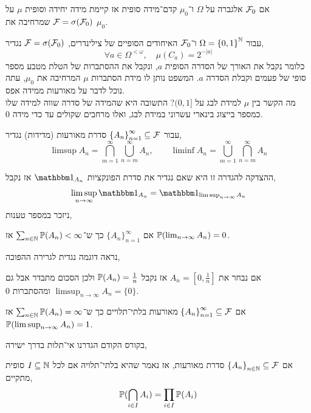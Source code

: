\begin{theorem}
	אם $\mathcal{F}_0$ אלגברה על $\Omega$ ו־$\mu_0$ קדם־מידה סופית אז קיימת מידה יחידה וסופית $\mu$ על $\mathcal{F} = \sigma(\mathcal{F}_0)$ שמרחיבה את $\mu_0$.
\end{theorem}
\begin{example}
	עבור $\Omega = {\{0, 1\}}^{\mathbb{N}}$ ו־$\mathcal{F}_0$ האיחודים הסופיים של צילינדרים, $\mathcal{F} = \sigma(\mathcal{F}_0)$ נגדיר,
	\[
		\forall a \in \Omega^{< \omega},
		\quad
		\mu(C_a)
		= 2^{-|a|}
	\]
	כלומר נקבל את האורך של הסדרה הסופית $a$, ונקבל את ההסתברות של הטלת מטבע מספר סופי של פעמים וקבלת הסדרה $a$.
	המשפט נותן לו מידת הסתברות $\mu$ המרחיבה את $\mu_0$, עתה נוכל לדבר על מאורעות ממידה אפס. \\
	מה הקשר בין $\mu$ למידת לבג על $(0, 1]$?
	התשובה היא שהמידה של סדרה שווה למידה שלו כמספר בייצוג בינארי עשרוני במידת לבג, ואלו מרחבים שקולים עד כדי מידה 0.
\end{example}
\begin{definition}
	עבור ${\{ A_n \}}_{n = 1}^\infty \subseteq \mathcal{F}$ סדרת מאורעות (מדידות) נגדיר,
	\[
		\limsup A_n = \bigcap_{m = 1}^{\infty} \bigcup_{n = m}^{\infty} A_n,
		\qquad
		\liminf A_n = \bigcup_{m = 1}^{\infty} \bigcap_{n = m}^{\infty} A_n
	\]
\end{definition}
ההצדקה להגדרה זו היא שאם נגדיר את סדרת הפונקציות $\indicator_{A_n}$ אז נקבל,
\[
	\limsup_{n \to \infty} \indicator_{A_n}
	= \indicator_{\limsup_{n \to \infty} A_n}
\]
ניזכר במספר טענות,
\begin{lemma}
	אם ${\{ A_n \}}_{n = 1}^\infty$ כך ש־$\sum_{n \in \mathbb{N}} \mathbb{P}(A_n) < \infty$ אז $\mathbb{P}(\lim_{n \to \infty} A_n) = 0$.
\end{lemma}
נראה דוגמה נגדית לגרירה ההפוכה,
\begin{example}
	אם נבחר את $A_n = [0, \frac{1}{n}]$ אז נקבל $\mathbb{P}(A_n) = \frac{1}{n}$ ולכן הסכום מתבדר אבל גם $\limsup_{n \to \infty} A_n = \{ 0 \}$ ומהסתברות 0.
\end{example}
\begin{lemma}
	אם ${\{ A_n \}}_{n = 1}^\infty \subseteq \mathcal{F}$ מאורעות בלתי־תלויים כך ש־$\sum_{n \in \mathbb{N}} \mathbb{P}(A_n) = \infty$ אז $\mathbb{P}(\limsup_{n \to \infty} A_n) = 1$.
\end{lemma}
בקורס הקודם הגדרנו אי־תלות בדרך ישירה,
\begin{definition}
	אם ${\{ A_n \}}_{n \in \mathbb{N}} \subseteq \mathcal{F}$ סדרת מאורעות, אז נאמר שהיא בלתי־תלויה אם לכל $I \subseteq \mathbb{N}$ סופית מתקיים,
	\[
		\mathbb{P}(\bigcap_{i \in I} A_i)
		= \prod_{i \in I} \mathbb{P}(A_i)
	\]
\end{definition}
